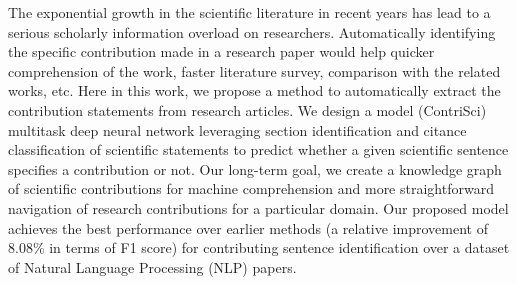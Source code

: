 The exponential growth in the scientific literature in recent years has lead to a serious scholarly information overload on researchers. Automatically identifying the specific contribution made in a research paper would help quicker comprehension of the work, faster literature survey, comparison with the related works, etc. Here in this work, we propose a method to automatically extract the contribution statements from research articles. We design a model (ContriSci) multitask deep neural network leveraging section identification and citance classification of scientific statements to predict whether a given scientific sentence specifies a contribution or not. Our long-term goal, we create a knowledge graph of scientific contributions for machine comprehension and more straightforward navigation of research contributions for a particular domain. Our proposed model achieves the best performance over earlier methods (a relative improvement of 8.08\% in terms of F1 score) for contributing sentence identification over a dataset of Natural Language Processing (NLP) papers.
